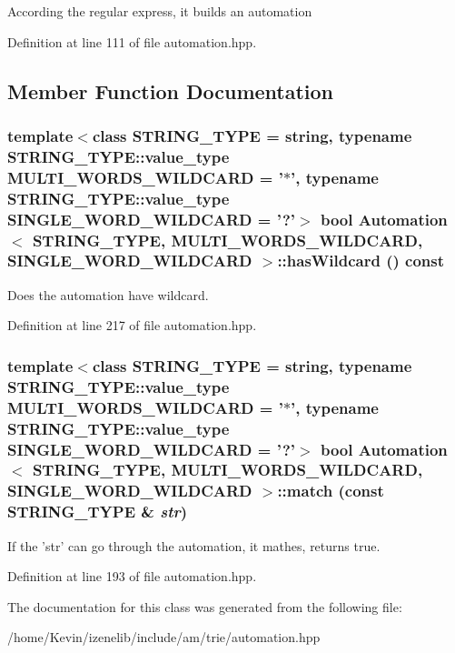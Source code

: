 According the regular express, it builds an automation 

Definition at line 111 of file automation.hpp.

\subsection{Member Function Documentation}
\hypertarget{classAutomation_520bbf0d1765ec51131897bad7579005}{
\subsubsection[{hasWildcard}]{\setlength{\rightskip}{0pt plus 5cm}template$<$class STRING\_\-TYPE  = string, typename STRING\_\-TYPE::value\_\-type MULTI\_\-WORDS\_\-WILDCARD = '$\ast$', typename STRING\_\-TYPE::value\_\-type SINGLE\_\-WORD\_\-WILDCARD = '?'$>$ bool {\bf Automation}$<$ STRING\_\-TYPE, MULTI\_\-WORDS\_\-WILDCARD, SINGLE\_\-WORD\_\-WILDCARD $>$::hasWildcard () const}}
\label{classAutomation_520bbf0d1765ec51131897bad7579005}


Does the automation have wildcard. 

Definition at line 217 of file automation.hpp.\hypertarget{classAutomation_b2f969eb8050ed62b16eba9d3e8ffaf6}{
\subsubsection[{match}]{\setlength{\rightskip}{0pt plus 5cm}template$<$class STRING\_\-TYPE  = string, typename STRING\_\-TYPE::value\_\-type MULTI\_\-WORDS\_\-WILDCARD = '$\ast$', typename STRING\_\-TYPE::value\_\-type SINGLE\_\-WORD\_\-WILDCARD = '?'$>$ bool {\bf Automation}$<$ STRING\_\-TYPE, MULTI\_\-WORDS\_\-WILDCARD, SINGLE\_\-WORD\_\-WILDCARD $>$::match (const STRING\_\-TYPE \& {\em str})}}
\label{classAutomation_b2f969eb8050ed62b16eba9d3e8ffaf6}


If the 'str' can go through the automation, it mathes, returns true. 

Definition at line 193 of file automation.hpp.

The documentation for this class was generated from the following file:\begin{CompactItemize}
\item 
/home/Kevin/izenelib/include/am/trie/automation.hpp\end{CompactItemize}
